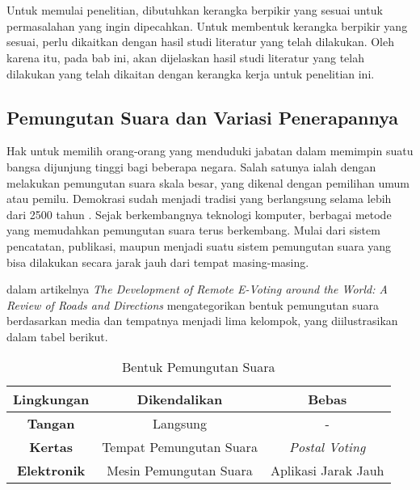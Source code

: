 \chapter{\babDua}
\label{bab:2}
Untuk memulai penelitian, dibutuhkan kerangka berpikir yang sesuai untuk permasalahan yang ingin dipecahkan. Untuk membentuk kerangka berpikir yang sesuai, perlu dikaitkan dengan hasil studi literatur yang telah dilakukan. Oleh karena itu, pada bab ini, akan dijelaskan hasil studi literatur yang telah dilakukan yang telah dikaitan dengan kerangka kerja untuk penelitian ini.
\section{Pemungutan Suara dan Variasi Penerapannya}

Hak untuk memilih orang-orang yang menduduki jabatan dalam memimpin suatu bangsa dijunjung tinggi bagi beberapa negara. Salah satunya ialah dengan melakukan pemungutan suara skala besar, yang dikenal dengan pemilihan umum atau pemilu. Demokrasi sudah menjadi tradisi yang berlangsung selama lebih dari 2500 tahun \citep{hansen2005tradition, review1}. Sejak berkembangnya teknologi komputer, berbagai metode yang memudahkan pemungutan suara terus berkembang. Mulai dari sistem pencatatan, publikasi, maupun menjadi suatu sistem pemungutan suara yang bisa dilakukan secara jarak jauh dari tempat masing-masing.

\cite{review1} dalam artikelnya \textit{The Development of Remote E-Voting around the World:  A Review of Roads and Directions} mengategorikan bentuk pemungutan suara berdasarkan media dan tempatnya menjadi lima kelompok, yang diilustrasikan dalam tabel berikut.

\begin{table}[h]
\centering
\begin{tabular}{|c|c|c|}
\hline
\textbf{Lingkungan} & \textbf{Dikendalikan}   & \textbf{Bebas}      \\ \hline
\textbf{Tangan}     & Langsung                & -                   \\ \hline
\textbf{Kertas}     & Tempat Pemungutan Suara & \textit{Postal Voting}     \\ \hline
\textbf{Elektronik} & Mesin Pemungutan Suara  & Aplikasi Jarak Jauh \\ \hline
\end{tabular}
\caption{Bentuk Pemungutan Suara}
\end{table}

